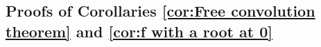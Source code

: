 \documentclass[reqno]{amsart}
\newcommand{\1}{\mathbf{1}}
\newcommand{\R}{\mathbb{R}}
\def\R{\mathbb{R}}
\newcommand{\LP}{\mathcal{LP}}
\theoremstyle{plain}
\theoremstyle{definition}
\theoremstyle{remark}
\numberwithin{equation}{section}
\begin{document}
	
		\subsection{Proofs of Corollaries  \ref{cor:Free convolution theorem} and \ref{cor:f with a root at 0}}
%		
%		
%		
\end{document}
